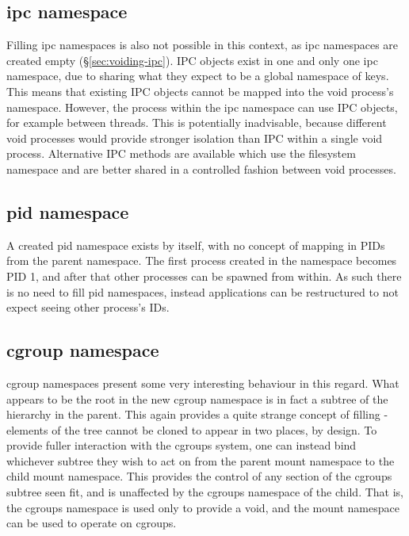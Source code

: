 \documentclass[12pt,a4paper,twoside]{report}
\begin{document}
\subsection{ipc namespace}
\label{sec:filling-ipc}

Filling ipc namespaces is also not possible in this context, as ipc namespaces are created empty (§\ref{sec:voiding-ipc}). IPC objects exist in one and only one ipc namespace, due to sharing what they expect to be a global namespace of keys. This means that existing IPC objects cannot be mapped into the void process's namespace. However, the process within the ipc namespace can use IPC objects, for example between threads. This is potentially inadvisable, because different void processes would provide stronger isolation than IPC within a single void process. Alternative IPC methods are available which use the filesystem namespace and are better shared in a controlled fashion between void processes.

\subsection{pid namespace}
\label{sec:filling-pid}

A created pid namespace exists by itself, with no concept of mapping in PIDs from the parent namespace. The first process created in the namespace becomes PID 1, and after that other processes can be spawned from within. As such there is no need to fill pid namespaces, instead applications can be restructured to not expect seeing other process's IDs.

\subsection{cgroup namespace}
\label{sec:filling-cgroup}

cgroup namespaces present some very interesting behaviour in this regard. What appears to be the root in the new cgroup namespace is in fact a subtree of the hierarchy in the parent. This again provides a quite strange concept of filling - elements of the tree cannot be cloned to appear in two places, by design. To provide fuller interaction with the cgroups system, one can instead bind whichever subtree they wish to act on from the parent mount namespace to the child mount namespace. This provides the control of any section of the cgroups subtree seen fit, and is unaffected by the cgroups namespace of the child. That is, the cgroups namespace is used only to provide a void, and the mount namespace can be used to operate on cgroups.
\end{document}
